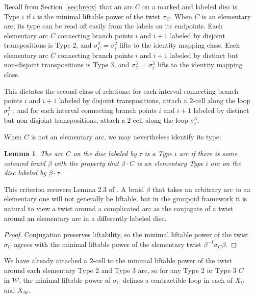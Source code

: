 \documentclass{amsart}
\newtheorem{lemma}[theorem]{Lemma}
\theoremstyle{definition}
\begin{document}
 Recall from Section~\ref{sec:brcov} that an arc $C$ on a marked and labeled disc is Type $i$ if $i$ is the minimal liftable power of the twist $\sigma_C$.   When $C$ is an elementary arc, its type can be read off easily from the labels on its endpoints.    Each elementary arc $C$ connecting branch points $i$ and $i+1$ labeled by disjoint transpositions is Type 2, and  $\sigma^2_C=\sigma^2_i$ lifts to the identity mapping class. Each elementary arc $C$ connecting branch points $i$ and $i+1$ labeled by distinct but non-disjoint transpositions is Type 3, and $\sigma^3_C=\sigma^3_i$ lifts to the identity mapping class. 

 This dictates the second class of relations: for each interval connecting branch points $i$ and $i+1$ labeled by disjoint transpositions, attach a $2$-cell along the loop $\sigma_i^2$ ; and  for each interval connecting branch points $i$ and $i+1$ labeled by distinct but non-disjoint transpositions, attach a $2$-cell along the loop $\sigma_i^3$.  

 
 When $C$ is not an elementary arc, we may nevertheless identify its type: 
 
 \begin{lemma} The arc $C$ on the disc labeled by $\tau$ is a Type $i$ arc if there is some coloured braid $\beta$ with the property that $\beta\cdot C$ is an elementary Type $i$ arc on the disc labeled by $\beta\cdot \tau$.
\end{lemma} 

This criterion recovers Lemma 2.3 of \cite{MP}.  A braid $\beta$ that takes an arbitrary arc to an elementary one will not generally be liftable, but in the groupoid framework  it is natural to view a twist around a complicated arc as the conjugate of a twist around an elementary arc in a differently labeled disc.  


\begin{proof} Conjugation preserves liftability, so the minimal liftable power of the twist $\sigma_C$ agrees with the minimal liftable power of the elementary twist $\beta^{-1}\sigma_C\beta$. 
\end{proof} 



We have already attached a $2$-cell to the minimal liftable power of the twist around each elementary Type 2 and Type 3 arc, so for any Type 2 or Type 3 $C$ in $\mathcal{W}$, the minimal liftable power of $\sigma_C$ defines a contractible loop in each of $X_\mathcal{G}$ and $X_\mathcal{M}$.  
\end{document}
